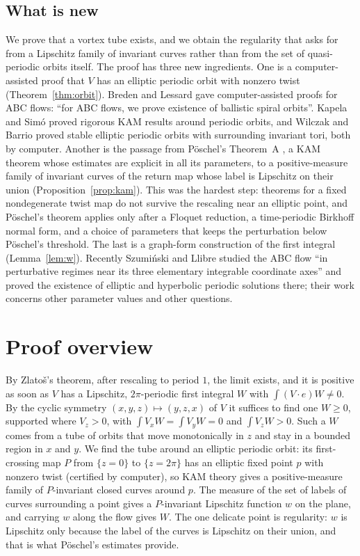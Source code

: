 \documentclass[11pt]{article}
\theoremstyle{definition}
\theoremstyle{remark}
\begin{document}
\subsection{What is new}
We prove that a vortex tube exists, and we obtain the regularity that
\cite{MXYZ} asks for from a Lipschitz family of invariant curves rather than
from the set of quasi-periodic orbits itself. The proof has three new
ingredients. One is a computer-assisted proof that $V$ has an elliptic periodic orbit with nonzero
twist (Theorem~\ref{thm:orbit}). Breden and Lessard \cite{BL} gave
computer-assisted proofs for ABC flows: ``for ABC flows, we prove existence of
ballistic spiral orbits''. Kapela and Simó \cite{KS} proved rigorous KAM
results around periodic orbits, and Wilczak and Barrio \cite{WB} proved
stable elliptic periodic orbits with surrounding invariant tori, both by
computer. Another is the
passage from Pöschel's Theorem~A \cite{P}, a KAM theorem whose estimates are
explicit in all its parameters, to a positive-measure family of invariant
curves of the return map whose label is Lipschitz on their union
(Proposition~\ref{prop:kam}). This was the hardest step: theorems for a fixed
nondegenerate twist map do not survive the rescaling near an elliptic point,
and Pöschel's theorem applies only after a Floquet reduction, a time-periodic
Birkhoff normal form, and a choice of parameters that keeps the
perturbation below Pöschel's threshold. The last is a graph-form construction of
the first integral (Lemma~\ref{lem:w}). Recently Szumiński and Llibre
\cite{SzL} studied the ABC flow ``in perturbative regimes near its three
elementary integrable coordinate axes'' and proved the existence of elliptic
and hyperbolic periodic solutions there; their work concerns other parameter
values and other questions.

\section{Proof overview}
By Zlatoš's theorem, after rescaling to period $1$, the limit exists, and it
is positive as soon as $V$ has a Lipschitz, $2\pi$-periodic first integral $W$
with $\int (V\cdot e)W\ne0$. By the cyclic symmetry $(x,y,z)\mapsto(y,z,x)$ of
$V$ it suffices to find one $W\ge0$, supported where $V_z>0$, with
$\int V_xW=\int V_yW=0$ and $\int V_zW>0$. Such a $W$ comes from a tube of
orbits that move monotonically in $z$ and stay in a bounded region in $x$ and
$y$. We find the tube around an elliptic periodic orbit: its first-crossing
map $P$ from $\{z=0\}$ to $\{z=2\pi\}$ has an elliptic fixed point $p$
with nonzero twist (certified by computer), so KAM theory gives a
positive-measure family of $P$-invariant closed curves around $p$. The
measure of the set of labels of curves surrounding a point gives a
$P$-invariant Lipschitz function $w$ on the plane, and carrying $w$ along the
flow gives $W$. The one delicate point is regularity: $w$ is Lipschitz only
because the label of the curves is Lipschitz on their union, and that is what
Pöschel's estimates provide.
\end{document}

